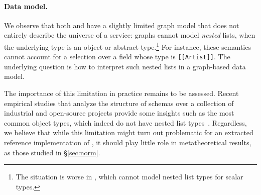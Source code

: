 \paragraph{Data model.} We observe that both \HP
and \gcoql have a slightly limited graph model that does not entirely describe the universe of a \gql service: graphs cannot model {\em nested} lists, when the underlying type is an object or abstract type.\footnote{The situation is worse in \HP, which cannot model nested list types for scalar types.}
For instance, these semantics cannot account for a selection over a field whose type is \texttt{[[Artist]]}.
%
The underlying question is how to interpret such nested lists in a graph-based data model.


The importance of this limitation in practice remains to be assessed. Recent empirical studies that analyze the structure of \gql schemas 
over a collection of industrial and open-source projects provide some 
insights such as the most 
common object types, which 
indeed do not have nested list types~\cite{empiricalgql,empiricalapi}. 
Regardless, we believe that while this limitation might turn out problematic for an extracted reference implementation of \gql, it should play little role in metatheoretical results, as those studied in \S\ref{sec:norm}.


